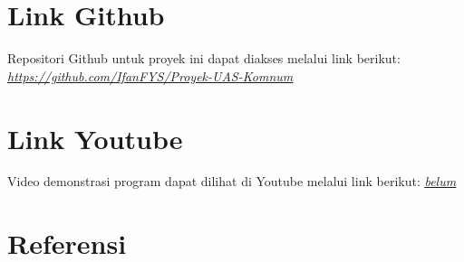 \documentclass[conference]{IEEEtran}
\begin{document}
\section*{Link Github}
Repositori Github untuk proyek ini dapat diakses melalui link berikut:
\href{https://github.com/IfanFYS/Proyek-UAS-Komnum}{\textit{\underline{https://github.com/IfanFYS/Proyek-UAS-Komnum}}}

\section*{Link Youtube}
Video demonstrasi program dapat dilihat di Youtube melalui link berikut:
\href{belum}{\textit{\underline{belum}}}

\section*{Referensi}



\end{document}
